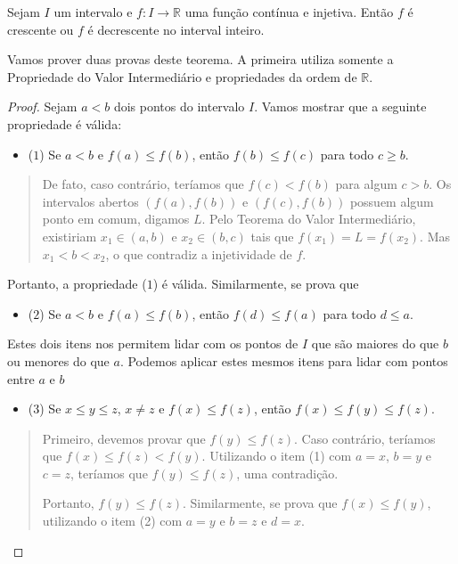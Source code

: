 \begin{theorem}
	Sejam $I$ um intervalo e $f\colon I\to\mathbb{R}$ uma função contínua e injetiva. Então $f$ é crescente ou $f$ é decrescente no interval inteiro.
\end{theorem}

Vamos prover duas provas deste teorema. A primeira utiliza somente a Propriedade do Valor Intermediário e propriedades da ordem de $\mathbb{R}$.

\begin{proof}
	Sejam $a<b$ dois pontos do intervalo $I$. Vamos mostrar que a seguinte propriedade é válida:
	\begin{itemize}
		\item ($1$) Se $a<b$ e $f(a)\leq f(b)$, então $f(b)\leq f(c)$ para todo $c\geq b$. 
	\end{itemize}
	
	\begin{quote}
		De fato, caso contrário, teríamos que $f(c)<f(b)$ para algum $c>b$. Os intervalos abertos $(f(a),f(b))$ e $(f(c),f(b))$ possuem algum ponto em comum, digamos $L$. Pelo Teorema do Valor Intermediário, existiriam $x_1\in (a,b)$ e $x_2\in (b,c)$ tais que $f(x_1)=L=f(x_2)$. Mas $x_1<b<x_2$, o que contradiz a injetividade de $f$.
	\end{quote}
	
	Portanto, a propriedade ($1$) é válida. Similarmente, se prova que
	\begin{itemize}
		\item ($2$) Se $a<b$ e $f(a)\leq f(b)$, então $f(d)\leq f(a)$ para todo $d\leq a$.
	\end{itemize}
	
	Estes dois itens nos permitem lidar com os pontos de $I$ que são maiores do que $b$ ou menores do que $a$. Podemos aplicar estes mesmos itens para lidar com pontos entre $a$ e $b$
	
	\begin{itemize}
		\item ($3$) Se $x\leq y\leq z$, $x\neq z$ e $f(x)\leq f(z)$, então $f(x)\leq f(y)\leq f(z)$.
	\end{itemize}

	\begin{quote}
		Primeiro, devemos provar que $f(y)\leq f(z)$. Caso contrário, teríamos que $f(x)\leq f(z)< f(y)$. Utilizando o item (1) com $a=x$, $b=y$ e $c=z$, teríamos que $f(y)\leq f(z)$, uma contradição.
		
		Portanto, $f(y)\leq f(z)$. Similarmente, se prova que $f(x)\leq f(y)$, utilizando o item (2) com $a=y$ e $b=z$ e $d=x$.
	\end{quote}
	

\end{proof}

